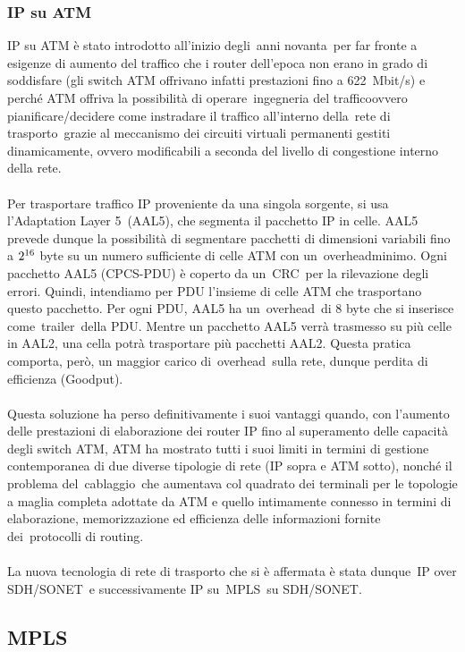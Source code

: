\documentclass{article}
\begin{document}
\subsubsection{IP su ATM}
IP su ATM è stato introdotto all'inizio degli anni novanta per far fronte a esigenze di aumento del 
traffico che i router dell'epoca non erano in grado di soddisfare (gli switch ATM offrivano infatti 
prestazioni fino a 622 Mbit/s) e perché ATM offriva la possibilità di operare ingegneria del trafficoovvero 
pianificare/decidere come instradare il traffico all'interno della rete di trasporto grazie al meccanismo 
dei circuiti virtuali permanenti gestiti dinamicamente, ovvero modificabili a seconda del livello di 
congestione interno della rete.\\\\
Per trasportare traffico IP proveniente da una singola sorgente, si usa l'Adaptation Layer 5 (AAL5), 
che segmenta il pacchetto IP in celle. AAL5 prevede dunque la possibilità di segmentare pacchetti di 
dimensioni variabili fino a $2\textsuperscript{16}$ byte su un numero sufficiente di celle ATM con un overheadminimo. 
Ogni pacchetto AAL5 (CPCS-PDU) è coperto da un CRC per la rilevazione degli errori. Quindi, intendiamo 
per PDU l'insieme di celle ATM che trasportano questo pacchetto. Per ogni PDU, AAL5 ha un overhead di 8 
byte che si inserisce come trailer della PDU. Mentre un pacchetto AAL5 verrà trasmesso su più celle in 
AAL2, una cella potrà trasportare più pacchetti AAL2. Questa pratica comporta, però, un maggior carico 
di overhead sulla rete, dunque perdita di efficienza (Goodput).\\\\
Questa soluzione ha perso definitivamente i suoi vantaggi quando, con l'aumento delle prestazioni di 
elaborazione dei router IP fino al superamento delle capacità degli switch ATM, ATM ha mostrato tutti 
i suoi limiti in termini di gestione contemporanea di due diverse tipologie di rete (IP sopra e ATM 
sotto), nonché il problema del cablaggio che aumentava col quadrato dei terminali per le topologie 
a maglia completa adottate da ATM e quello intimamente connesso in termini di elaborazione, 
memorizzazione ed efficienza delle informazioni fornite dei protocolli di routing.\\\\
La nuova tecnologia di rete di trasporto che si è affermata è stata dunque IP over SDH/SONET e 
successivamente IP su MPLS su SDH/SONET.
\subsection{MPLS}
\end{document}

